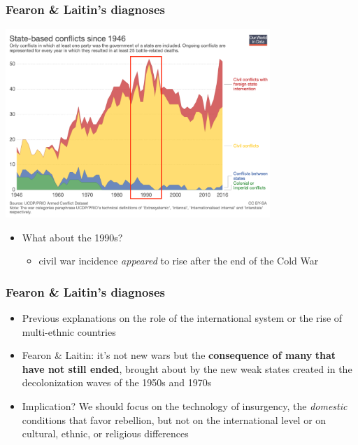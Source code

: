 \documentclass[aspectratio=43]{beamer}
\begin{document}
\begin{frame}
\frametitle{Fearon \& Laitin's diagnoses}
\centering

\includegraphics[width = 0.75\textwidth]{img/conflicts_over_time90}

\begin{itemize}
  \item What about the 1990s?
  \begin{itemize}
    \item civil war incidence \textit{appeared} to rise after the end of the Cold War
  \end{itemize}
\end{itemize}

\end{frame}

\begin{frame}
\frametitle{Fearon \& Laitin's diagnoses}
\centering

\begin{itemize}
  \item Previous explanations on the role of the international system or the rise of multi-ethnic countries
  \item<2-> Fearon \& Laitin: it's not new wars but the \textbf{consequence of many}  \textbf{that have not still ended}, brought about by the new weak states created in the decolonization waves of the 1950s and 1970s
  \item<3-> Implication? We should focus on the technology of insurgency, the \textit{domestic} conditions that favor rebellion, but not on the international level or on cultural, ethnic, or religious differences
\end{itemize}

\end{frame}
\end{document}
